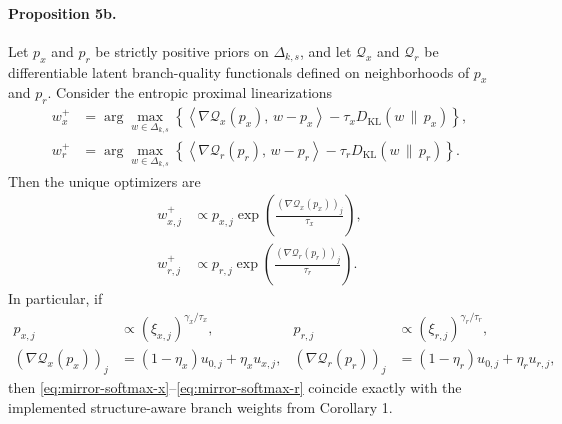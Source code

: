 \paragraph{Proposition 5b.}
Let $p_x$ and $p_r$ be strictly positive priors on $\Delta_{k,s}$, and let $\mathcal{Q}_x$ and $\mathcal{Q}_r$ be differentiable latent branch-quality functionals defined on neighborhoods of $p_x$ and $p_r$. Consider the entropic proximal linearizations
\begin{align}
w_x^{+}
&=
\arg\max_{w \in \Delta_{k,s}}
\left\{
\left\langle \nabla \mathcal{Q}_x(p_x),\, w-p_x \right\rangle
- \tau_x D_{\mathrm{KL}}(w \,\|\, p_x)
\right\},
\label{eq:mirror-step-x}
\\
w_r^{+}
&=
\arg\max_{w \in \Delta_{k,s}}
\left\{
\left\langle \nabla \mathcal{Q}_r(p_r),\, w-p_r \right\rangle
- \tau_r D_{\mathrm{KL}}(w \,\|\, p_r)
\right\}.
\label{eq:mirror-step-r}
\end{align}
Then the unique optimizers are
\begin{align}
w_{x,j}^{+}
&\propto
p_{x,j}\exp\!\left(\frac{(\nabla \mathcal{Q}_x(p_x))_j}{\tau_x}\right),
\label{eq:mirror-softmax-x}
\\
w_{r,j}^{+}
&\propto
p_{r,j}\exp\!\left(\frac{(\nabla \mathcal{Q}_r(p_r))_j}{\tau_r}\right).
\label{eq:mirror-softmax-r}
\end{align}
In particular, if
\begin{align}
p_{x,j} &\propto \left(\xi_{x,j}\right)^{\gamma_x/\tau_x},
&
p_{r,j} &\propto \left(\xi_{r,j}\right)^{\gamma_r/\tau_r},
\\
(\nabla \mathcal{Q}_x(p_x))_j &= (1-\eta_x)u_{0,j} + \eta_x u_{x,j},
&
(\nabla \mathcal{Q}_r(p_r))_j &= (1-\eta_r)u_{0,j} + \eta_r u_{r,j},
\end{align}
then \eqref{eq:mirror-softmax-x}--\eqref{eq:mirror-softmax-r} coincide exactly with the implemented structure-aware branch weights from Corollary 1.

